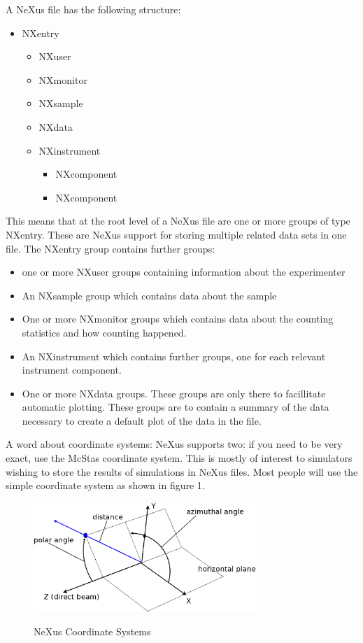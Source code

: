 \documentclass[a4paper]{article}\usepackage[dvips]{graphicx}
\begin{document}
A NeXus file has the following structure:


\begin{itemize}\item NXentry
\begin{itemize}\item NXuser
\item NXmonitor
\item NXsample
\item NXdata
\item NXinstrument
\begin{itemize}\item NXcomponent
\item NXcomponent
\end{itemize}\end{itemize}\end{itemize}This means that at the root level of a NeXus file are one or more groups of type NXentry. These are NeXus support for 
storing multiple related data sets in one file. The NXentry group contains further groups:


\begin{itemize}\item one or more NXuser groups containing information about the experimenter
\item An NXsample group which contains data about the sample
\item One or more NXmonitor groups which contains data about the counting statistics and how counting happened.
\item An NXinstrument which contains further groups, one for each relevant instrument component.
\item One or more NXdata groups. These groups are only there to facillitate automatic plotting. These groups 
 are to contain a summary of the data necessary to create a default plot of the data in the file.
\end{itemize}

A word about coordinate systems: NeXus supports two: if you need to be very exact, use the McStas coordinate system. 
This is mostly of interest to simulators wishing to store the results of simulations in NeXus files. Most people will use the 
simple coordinate system as shown in figure 1. 


\begin{figure}[!ht]
\includegraphics[width=0.75\textwidth]{polplane.eps}
\label{fig1}
\caption{NeXus Coordinate Systems} 
\end{figure}
\end{document}
